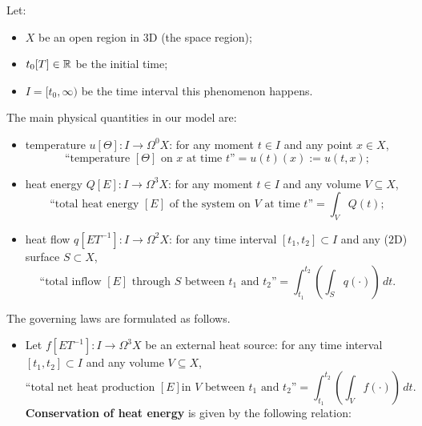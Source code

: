 \begin{discussion}
  \label{idec/heat_transport/continuous/model_with_differential_forms-discussion}
  Let:
  \begin{itemize}
    \item
      $X$ be an open region in $3$D (the space region);
    \item
      $t_0 [T] \in \mathbb{R}$ be the initial time;
    \item
      $I = [t_0, \infty)$ be the time interval this phenomenon happens.
  \end{itemize}
  The main physical quantities in our model are:
  \begin{itemize}
    \item
      temperature $u [\Theta] \colon I \to \Omega^0 X$:
      for any moment $t \in I$ and any point $x \in X$,
      \begin{equation}
        \text{``temperature $[\Theta]$ on $x$ at time $t$''}
        = u(t)(x) := u(t, x);
      \end{equation}
    \item
      heat energy $Q [E]\colon I \to \Omega^3 X$:
      for any moment $t \in I$ and any volume $V \subseteq X$,
      \begin{equation}
        \text{``total heat energy $[E]$ of the system on $V$ at time $t$''}
        = \int_V Q(t);
      \end{equation}
    \item
      heat flow $q [E T^{-1}] \colon I \to \Omega^2 X$:
      for any time interval $[t_1, t_2] \subset I$
      and any ($2$D) surface $S \subset X$,
      \begin{equation}
        \text{``total inflow $[E]$ through $S$ between $t_1$ and $t_2$''}
        = \int_{t_1}^{t_2} \left(\int_S q(\cdot) \right)\, d t.
      \end{equation}
  \end{itemize}
  The governing laws are formulated as follows.
  \begin{itemize}
    \item
      Let $f [E T^{-1}] \colon I \to \Omega^3 X$ be an external heat source:
      for any time interval $[t_1, t_2] \subset I$
      and any volume $V \subseteq X$,
      \begin{equation}
        \text{``total net heat production $[E]$
          in $V$ between $t_1$ and $t_2$''}
        = \int_{t_1}^{t_2} \left(\int_V f(\cdot) \right)\, d t.
      \end{equation}
      \textbf{Conservation of heat energy} is given by the following relation:

\end{itemize}
\end{discussion}
